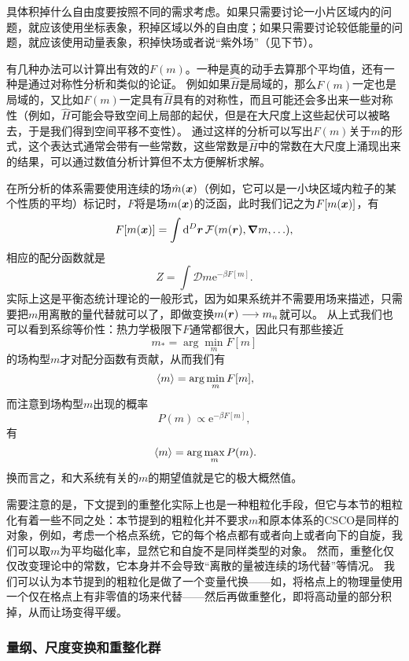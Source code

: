 \documentclass[hyperref, UTF8, a4paper]{ctexart}
\newcommand*{\ee}{\mathrm{e}}
\newcommand*{\fd}[1]{\mathcal{D}{#1}}
\begin{document}
具体积掉什么自由度要按照不同的需求考虑。如果只需要讨论一小片区域内的问题，就应该使用坐标表象，积掉区域以外的自由度；如果只需要讨论较低能量的问题，就应该使用动量表象，积掉快场或者说“紫外场”（见下节）。

有几种办法可以计算出有效的$F(m)$。一种是真的动手去算那个平均值，还有一种是通过对称性分析和类似的论证。
例如如果$\hat{H}$是局域的，那么$F(m)$一定也是局域的，又比如$F(m)$一定具有$\hat{H}$具有的对称性，而且可能还会多出来一些对称性（例如，$\hat{H}$可能会导致空间上局部的起伏，但是在大尺度上这些起伏可以被略去，于是我们得到空间平移不变性）。
通过这样的分析可以写出$F(m)$关于$m$的形式，这个表达式通常会带有一些常数，这些常数是$\hat{H}$中的常数在大尺度上涌现出来的结果，可以通过数值分析计算但不太方便解析求解。

在所分析的体系需要使用连续的场$\hat{m}(\vb*{x})$（例如，它可以是一小块区域内粒子的某个性质的平均）标记时，$F$将是场$m(\vb*{x})$的泛函，此时我们记之为$F[m(\vb*{x})]$，有
\[
    F[m(\vb*{x})] = \int \dd[D]{\vb*{r}} \mathcal{F}(m(\vb*{r}), \grad{m}, \ldots), 
\]
相应的配分函数就是
\[
    Z = \int \fd{m} \ee^{- \beta F[m]}.
\]
实际上这是平衡态统计理论的一般形式，因为如果系统并不需要用场来描述，只需要把$m$用离散的量代替就可以了，即做变换$m(\vb*{r}) \longrightarrow m_n$就可以。
从上式我们也可以看到系综等价性：热力学极限下$F$通常都很大，因此只有那些接近
\[
    m_* = \arg\min_m F[m]
\]
的场构型$m$才对配分函数有贡献，从而我们有
\[
    \expval*{m} = \arg\min_m F[m],
\]
而注意到场构型$m$出现的概率
\[
    P(m) \propto \ee^{-\beta F[m]},
\]
有
\[
    \expval*{m} = \arg\max_m P(m).
\]
换而言之，和大系统有关的$m$的期望值就是它的极大概然值。

需要注意的是，下文提到的重整化实际上也是一种粗粒化手段，但它与本节的粗粒化有着一些不同之处：本节提到的粗粒化并不要求$m$和原本体系的CSCO是同样的对象，例如，考虑一个格点系统，它的每个格点都有或者向上或者向下的自旋，我们可以取$m$为平均磁化率，显然它和自旋不是同样类型的对象。
然而，重整化仅仅改变理论中的常数，它本身并不会导致“离散的量被连续的场代替”等情况。
我们可以认为本节提到的粗粒化是做了一个变量代换——如，将格点上的物理量使用一个仅在格点上有非零值的场来代替——然后再做重整化，即将高动量的部分积掉，从而让场变得平缓。

\subsubsection{量纲、尺度变换和重整化群}

\end{document}
